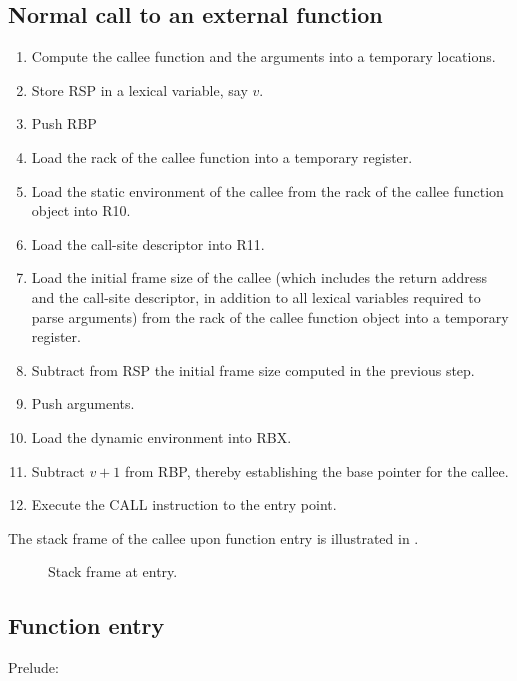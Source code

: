 \subsection{Normal call to an external function}

\begin{enumerate}
\item Compute the callee function and the arguments into a temporary
  locations.
\item Store RSP in a lexical variable, say $v$.
\item Push RBP
\item Load the rack of the callee function into a temporary register.
\item Load the static environment of the callee from the rack of the
  callee function object into R10.
\item Load the call-site descriptor into R11.
\item Load the initial frame size of the callee (which
  includes the return address and the call-site descriptor, in
  addition to all lexical variables required to parse arguments) from
  the rack of the callee function object into a temporary register.
\item Subtract from RSP the initial frame size computed in the
  previous step.
\item Push arguments.
\item Load the dynamic environment into RBX.
\item Subtract $v+1$ from RBP, thereby establishing the base pointer
  for the callee.
\item Execute the CALL instruction to the entry point.
\end{enumerate}

The stack frame of the callee upon function entry is illustrated in
.

\begin{figure}
\begin{center}
\end{center}
\caption{\label{fig-x86-64-alternative-stack-frame-at-entry}
Stack frame at entry.}
\end{figure}

\subsection{Function entry}

Prelude:


